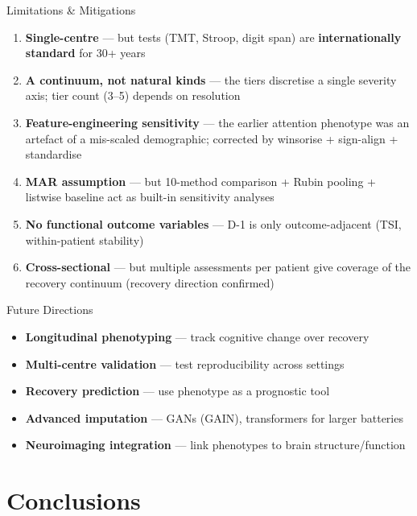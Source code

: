 \documentclass[aspectratio=169, 11pt]{beamer}
\begin{document}
\begin{frame}{Limitations \& Mitigations}
  \small
  \begin{enumerate}
    \item \textbf{Single-centre} --- but tests (TMT, Stroop, digit span) are \textbf{internationally standard} for 30+ years
    \item \textbf{A continuum, not natural kinds} --- the tiers discretise a single severity axis; tier count (3--5) depends on resolution
    \item \textbf{Feature-engineering sensitivity} --- the earlier attention phenotype was an artefact of a mis-scaled demographic; corrected by winsorise + sign-align + standardise
    \item \textbf{MAR assumption} --- but 10-method comparison + Rubin pooling + listwise baseline act as built-in sensitivity analyses
    \item \textbf{No functional outcome variables} --- D-1 is only outcome-adjacent (TSI, within-patient stability)
    \item \textbf{Cross-sectional} --- but multiple assessments per patient give coverage of the recovery continuum (recovery direction confirmed)
  \end{enumerate}
\end{frame}

\begin{frame}{Future Directions}
  \begin{itemize}
    \item \textbf{Longitudinal phenotyping} --- track cognitive change over recovery
    \item \textbf{Multi-centre validation} --- test reproducibility across settings
    \item \textbf{Recovery prediction} --- use phenotype as a prognostic tool
    \item \textbf{Advanced imputation} --- GANs (GAIN), transformers for larger batteries
    \item \textbf{Neuroimaging integration} --- link phenotypes to brain structure/function
  \end{itemize}
\end{frame}

\section{Conclusions}
\end{document}
